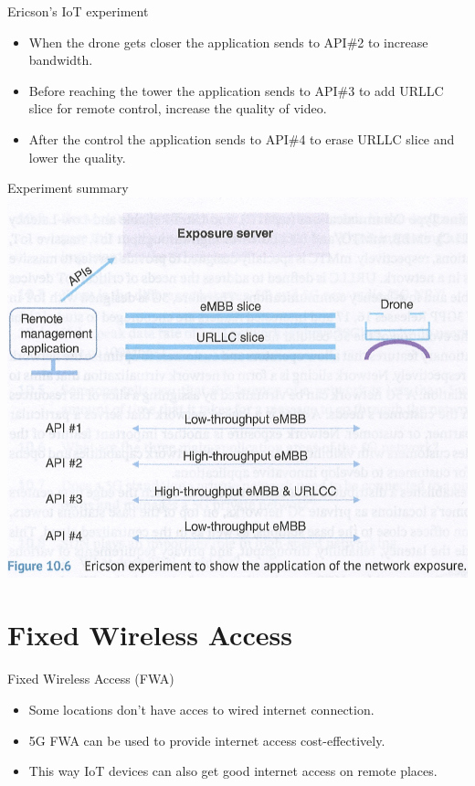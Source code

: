 \documentclass{beamer}
\begin{document}
\begin{frame}{Ericson's IoT experiment}
  \vspace*{1.6em}
  \begin{itemize}
    \item When the drone gets closer the application sends to API\#2 to increase bandwidth.
    \item Before reaching the tower the application sends to API\#3 to add URLLC slice for remote control, increase the quality of video.
    \item After the control the application sends to API\#4 to erase URLLC slice and lower the quality.
  \end{itemize}
\end{frame}

\begin{frame}{Experiment summary}
  \hspace*{0.4em}
  \includegraphics[scale=0.52]{fig/exposure-exp.png}
\end{frame}


\section[Fixed Wireless Access]{Fixed Wireless Access}


\begin{frame}{Fixed Wireless Access (FWA)}
  \vspace*{1.6em}
  \begin{itemize}
    \item Some locations don't have acces to wired internet connection.
    \vspace*{0.75em}
    \item 5G FWA can be used to provide internet access cost-effectively.
    \vspace*{0.75em}
    \item This way IoT devices can also get good internet access on remote places.
  \end{itemize}
\end{frame}
\end{document}
